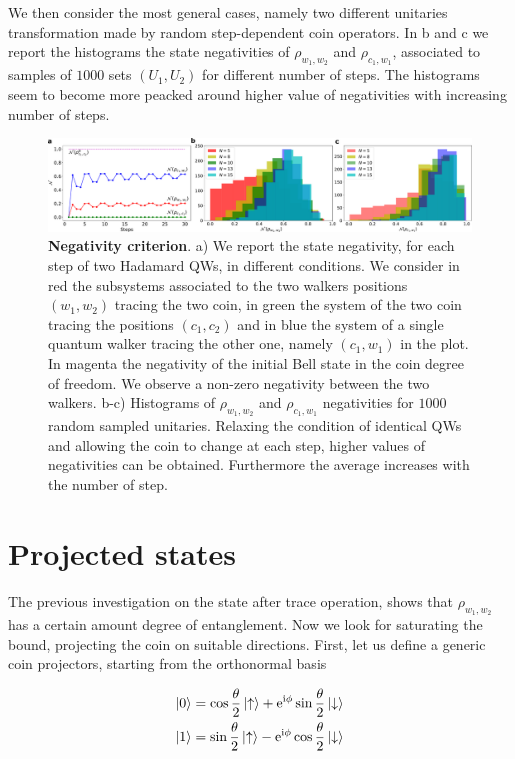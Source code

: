 \documentclass[
	aps, pra, authorblock, superscriptaddress, twocolumn,
	10pt
]{revtex4-1}
\begin{document}
 We then consider the most general cases, namely two different unitaries transformation made by random step-dependent coin operators. In b and c we report the histograms the state negativities of $\rho_{w_1,w_2}$ and $\rho_{c_1, w_1}$, associated to samples of $1000$ sets $(U_1,U_2)$ for different number of steps. The histograms seem to become more peacked around higher value of negativities with increasing number of steps.

 
\begin{figure}[hbt]
    \centering
    \includegraphics[width=\textwidth]{negs+rand.pdf}
    \caption{\textbf{Negativity criterion}. a) We report the state negativity, for each step of two Hadamard QWs, in different conditions. We consider in red the subsystems associated to the two walkers positions $(w_1,w_2) $ tracing the two coin, in green the system of the two coin tracing the positions $(c_1, c_2)$ and in blue the system of a single quantum walker tracing the other one, namely $(c_1, w_1)$ in the plot. In magenta the negativity of the initial Bell state in the coin degree of freedom. We observe a non-zero negativity between the two walkers. b-c) Histograms of $\rho_{w_1, w_2}$ and $\rho_{c_1, w_1}$ negativities for $1000$ random sampled unitaries. Relaxing the condition of identical QWs and allowing the coin to change at each step, higher values of negativities can be obtained. Furthermore the average increases with the number of step.}
    \label{fig:neg_trace}
\end{figure}



\section{Projected states}
The previous investigation on the state after trace operation, shows that $\rho_{w_1, w_2}$ has a certain amount degree of entanglement. Now we look for saturating the bound, projecting the coin on suitable directions. First, let us define a generic coin projectors, starting from the orthonormal basis

\begin{align}
 \ket{0} &= \cos{\frac{\theta}{2}} \ket{\uparrow}+ 
 \mathrm{e}^{\mathrm{i}\phi}\sin{\frac{\theta}{2}}\ket{\downarrow} \notag\\
 \ket{1} &= \sin{\frac{\theta}{2}} \ket{\uparrow}-
 \mathrm{e}^{\mathrm{i}\phi}\cos{\frac{\theta}{2}}\ket{\downarrow}
\end{align}
\end{document}
